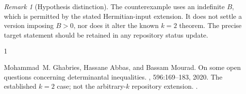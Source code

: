 \documentclass[10pt,a4paper]{article}
\theoremstyle{remark}
\newtheorem{remark}[theorem]{Remark}
\begin{document}
\begin{remark}[Hypothesis distinction]
The counterexample uses an indefinite $B$, which is permitted by the stated Hermitian-input extension. It does not settle a version imposing $B>0$, nor does it alter the known $k=2$ theorem. The precise target statement should be retained in any repository status update.
\end{remark}

\begin{thebibliography}{1}

Mohammad~M. Ghabries, Hassane Abbas, and Bassam Mourad.
\newblock On some open questions concerning determinantal inequalities.
, 596:169--183, 2020.
\newblock The established $k=2$ case; not the arbitrary-$k$ repository
  extension.
\newblock \href {https://doi.org/10.1016/j.laa.2020.03.009}
  {}.

\end{thebibliography}
\end{document}
